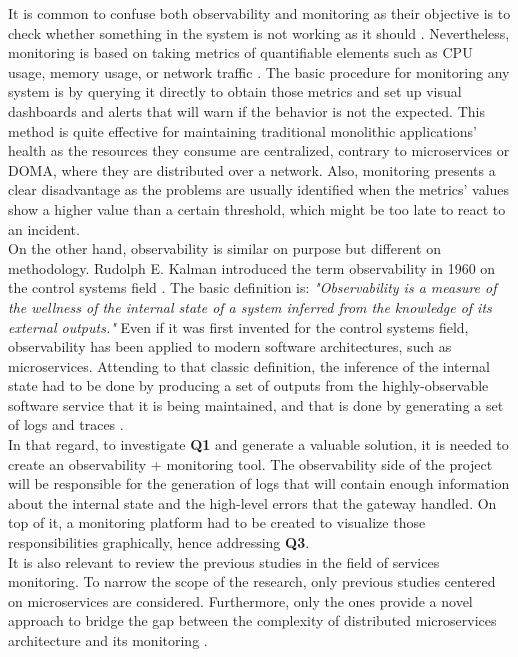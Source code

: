 \documentclass[english, 12pt, a4paper, sci, utf8, a-1b, online]{aaltothesis}
\begin{document}
It is common to confuse both observability and monitoring as their objective is to check whether something in the system is not working as it should \cite{ObservabilityvsMonitoring}. Nevertheless, monitoring is based on taking metrics of quantifiable elements such as CPU usage, memory usage, or network traffic \cite{MonitoringIEEE}. The basic procedure for monitoring any system is by querying it directly to obtain those metrics and set up visual dashboards and alerts that will warn if the behavior is not the expected. This method is quite effective for maintaining traditional monolithic applications' health as the resources they consume are centralized, contrary to microservices or DOMA, where they are distributed over a network. Also, monitoring presents a clear disadvantage as the problems are usually identified when the metrics' values show a higher value than a certain threshold, which might be too late to react to an incident.\\

On the other hand, observability is similar on purpose but different on methodology. Rudolph E. Kalman introduced the term observability in 1960 on the control systems field \cite{kalman1960general}. The basic definition is: \textit{"Observability is a measure of the wellness of the internal state of a system inferred from the knowledge of its external outputs."} Even if it was first invented for the control systems field, observability has been applied to modern software architectures, such as microservices. Attending to that classic definition, the inference of the internal state had to be done by producing a set of outputs from the highly-observable software service that it is being maintained, and that is done by generating a set of logs and traces \cite{picoreti2018multilevel}.\\

In that regard, to investigate \textbf{Q1} and generate a valuable solution, it is needed to create an observability + monitoring tool. The observability side of the project will be responsible for the generation of logs that will contain enough information about the internal state and the high-level errors that the gateway handled. On top of it, a monitoring platform had to be created to visualize those responsibilities graphically, hence addressing \textbf{Q3}.\\

It is also relevant to review the previous studies in the field of services monitoring. To narrow the scope of the research, only previous studies centered on microservices are considered. Furthermore, only the ones provide a novel approach to bridge the gap between the complexity of distributed microservices architecture and its monitoring \cite{niedermaier2019observability}.\\
\end{document}
